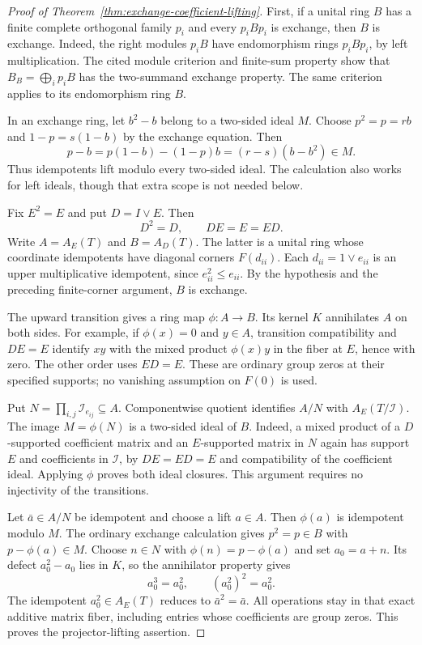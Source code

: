 \begin{proof}[Proof of Theorem~\ref{thm:exchange-coefficient-lifting}]
First, if a unital ring $B$ has a finite complete orthogonal
family $p_i$ and every $p_iBp_i$ is exchange, then $B$ is
exchange. Indeed, the right modules $p_iB$ have endomorphism
rings $p_iBp_i$, by left multiplication. The cited module
criterion and finite-sum property show that
$B_B=\bigoplus_i p_iB$ has the two-summand exchange property.
The same criterion applies to its endomorphism ring $B$.

In an exchange ring, let $b^2-b$ belong to a two-sided ideal
$M$. Choose $p^2=p=rb$ and $1-p=s(1-b)$ by the exchange
equation. Then
\[
 p-b=p(1-b)-(1-p)b=(r-s)(b-b^2)\in M.
\]
Thus idempotents lift modulo every two-sided ideal. The
calculation also works for left ideals, though that extra scope
is not needed below.

Fix $E^2=E$ and put $D=I\vee E$. Then
\[
 D^2=D,\qquad DE=E=ED.
\]
Write $A=A_E(T)$ and $B=A_D(T)$. The latter is a unital ring
whose coordinate idempotents have diagonal corners $F(d_{ii})$.
Each $d_{ii}=1\vee e_{ii}$ is an upper multiplicative
idempotent, since $e_{ii}^2\leq e_{ii}$. By the hypothesis
and the preceding finite-corner argument, $B$ is exchange.

The upward transition gives a ring map $\phi:A\to B$.
Its kernel $K$ annihilates $A$ on both sides. For example,
if $\phi(x)=0$ and $y\in A$, transition compatibility and
$DE=E$ identify $xy$ with the mixed product $\phi(x)y$ in
the fiber at $E$, hence with zero. The other order uses
$ED=E$. These are ordinary group zeros at their specified
supports; no vanishing assumption on $F(0)$ is used.

Put $N=\prod_{i,j}\mathcal I_{e_{ij}}\subseteq A$.
Componentwise quotient identifies $A/N$ with
$A_E(T/\mathcal I)$. The image $M=\phi(N)$ is a two-sided
ideal of $B$. Indeed, a mixed product of a $D$-supported
coefficient matrix and an $E$-supported matrix in $N$ again
has support $E$ and coefficients in $\mathcal I$, by
$DE=ED=E$ and compatibility of the coefficient ideal.
Applying $\phi$ proves both ideal closures. This argument
requires no injectivity of the transitions.

Let $\bar a\in A/N$ be idempotent and choose a lift
$a\in A$. Then $\phi(a)$ is idempotent modulo $M$.
The ordinary exchange calculation gives $p^2=p\in B$
with $p-\phi(a)\in M$. Choose $n\in N$ with
$\phi(n)=p-\phi(a)$ and set $a_0=a+n$. Its defect
$a_0^2-a_0$ lies in $K$, so the annihilator property gives
\[
 a_0^3=a_0^2,\qquad (a_0^2)^2=a_0^2.
\]
The idempotent $a_0^2\in A_E(T)$ reduces to
$\bar a^2=\bar a$. All operations stay in that exact
additive matrix fiber, including entries whose coefficients
are group zeros. This proves the projector-lifting assertion.


\end{proof}
